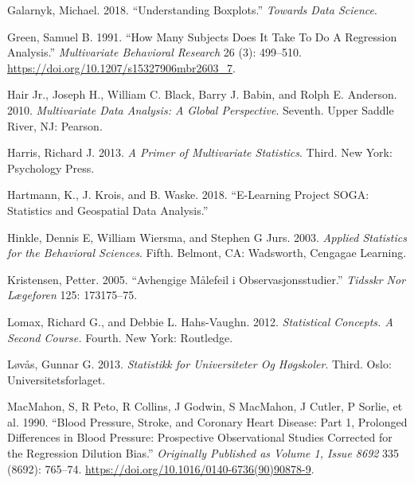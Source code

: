\documentclass[
]{article}
\newlength{\cslhangindent}
\newlength{\cslentryspacingunit} %
\newenvironment{CSLReferences}[2] %
 {%
  \setlength{\parindent}{0pt}
  \ifodd #1
  \let\oldpar\par
  \def\par{\hangindent=\cslhangindent\oldpar}
  \fi
  \setlength{\parskip}{#2\cslentryspacingunit}
 }%
 {}
\begin{document}
\begin{CSLReferences}{1}{0}
\leavevmode{}%
Galarnyk, Michael. 2018. {``Understanding {Boxplots}.''} \emph{Towards
Data Science}.

\leavevmode{}%
Green, Samuel B. 1991. {``How {Many Subjects Does It Take To Do A
Regression Analysis}.''} \emph{Multivariate Behavioral Research} 26 (3):
499--510. \url{https://doi.org/10.1207/s15327906mbr2603_7}.

\leavevmode{}%
Hair Jr., Joseph H., William C. Black, Barry J. Babin, and Rolph E.
Anderson. 2010. \emph{Multivariate {Data Analysis}: {A Global
Perspective}}. Seventh. {Upper Saddle River, NJ}: {Pearson}.

\leavevmode{}%
Harris, Richard J. 2013. \emph{A {Primer} of {Multivariate Statistics}}.
Third. {New York}: {Psychology Press}.

\leavevmode{}%
Hartmann, K., J. Krois, and B. Waske. 2018. {``E-{Learning Project
SOGA}: {Statistics} and {Geospatial Data Analysis}.''}

\leavevmode{}%
Hinkle, Dennis E, William Wiersma, and Stephen G Jurs. 2003.
\emph{Applied Statistics for the Behavioral Sciences}. Fifth. {Belmont,
CA}: {Wadsworth, Cengagae Learning}.

\leavevmode{}%
Kristensen, Petter. 2005. {``Avhengige Målefeil i
Observasjonsstudier.''} \emph{Tidsskr Nor Lægeforen} 125: 173175--75.

\leavevmode{}%
Lomax, Richard G., and Debbie L. Hahs-Vaughn. 2012. \emph{Statistical
{Concepts}. {A Second Course}.} Fourth. {New York}: {Routledge}.

\leavevmode{}%
Løvås, Gunnar G. 2013. \emph{Statistikk for Universiteter Og Høgskoler}.
Third. {Oslo}: {Universitetsforlaget}.

\leavevmode{}%
MacMahon, S, R Peto, R Collins, J Godwin, S MacMahon, J Cutler, P
Sorlie, et al. 1990. {``Blood Pressure, Stroke, and Coronary Heart
Disease: {Part} 1, Prolonged Differences in Blood Pressure: Prospective
Observational Studies Corrected for the Regression Dilution Bias.''}
\emph{Originally Published as Volume 1, Issue 8692} 335 (8692): 765--74.
\url{https://doi.org/10.1016/0140-6736(90)90878-9}.


\end{CSLReferences}
\end{document}
